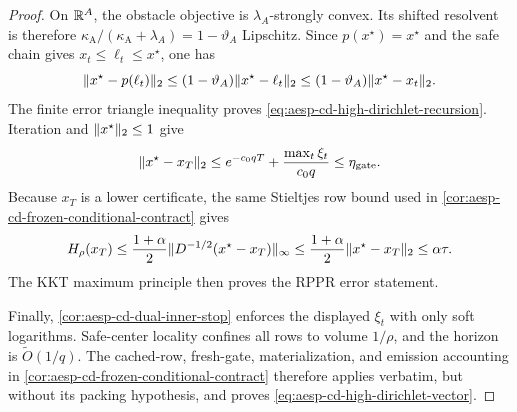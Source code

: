 \begin{proof}
On $\mathbb{R}^A$, the obstacle objective is $\lambda_A$-strongly convex.  Its
shifted resolvent is therefore
$\kappa_{\mathrm A}/(\kappa_{\mathrm A}+\lambda_A)
=1-\vartheta_A$ Lipschitz.  Since $p(x^\star)=x^\star$ and the safe chain
gives $x_t\leq\ell_t\leq x^\star$, one has
\begin{equation*}
 \lVert x^\star-p(\ell_t)\rVert_2
 \leq(1-\vartheta_A)\lVert x^\star-\ell_t\rVert_2
 \leq(1-\vartheta_A)\lVert x^\star-x_t\rVert_2.
\end{equation*}
The finite error triangle inequality proves
\cref{eq:aesp-cd-high-dirichlet-recursion}.  Iteration and
$\lVert x^\star\rVert_2\leq1$ give
\begin{equation*}
 \lVert x^\star-x_T\rVert_2
 \leq e^{-c_0qT}+\frac{\max_t\xi_t}{c_0q}
 \leq\eta_{\mathrm{gate}}.
\end{equation*}
Because $x_T$ is a lower certificate, the same Stieltjes row bound used in
\cref{cor:aesp-cd-frozen-conditional-contract} gives
\begin{equation*}
 H_\rho(x_T)
 \leq\frac{1+\alpha}{2}
       \lVert D^{-1/2}(x^\star-x_T)\rVert_\infty
 \leq\frac{1+\alpha}{2}\lVert x^\star-x_T\rVert_2
 \leq\alpha\tau.
\end{equation*}
The KKT maximum principle then proves the RPPR error statement.

Finally, \cref{cor:aesp-cd-dual-inner-stop} enforces the displayed
$\xi_t$ with only soft logarithms.  Safe-center locality confines all rows
to volume $1/\rho$, and the horizon is $\widetilde O(1/q)$.  The cached-row,
fresh-gate, materialization, and emission accounting in
\cref{cor:aesp-cd-frozen-conditional-contract} therefore applies verbatim,
but without its packing hypothesis, and proves
\cref{eq:aesp-cd-high-dirichlet-vector}.
\end{proof}
